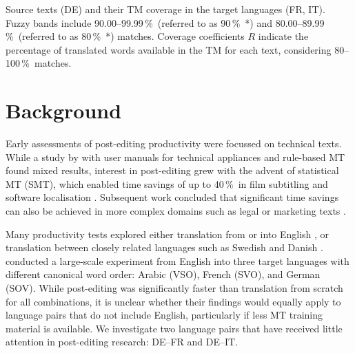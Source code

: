 \documentclass[11pt]{article}
\newcommand{\eg}{e.\,g.,\ }
\newcommand{\percent}{\,\%\ }
\begin{document}


\begin{table*}[t]
    \centering
    \renewcommand{\arraystretch}{1.2}
    \fontsize{10.1pt}{10.1pt}\selectfont
    
    \caption{Source texts (DE) and their TM coverage in the target languages (FR, IT). Fuzzy bands include 90.00--99.99\percent (referred to as 90\percent*) and 80.00--89.99\percent (referred to as 80\percent*) matches. Coverage coefficients $R$ indicate the percentage of translated words available in the TM for each text, considering 80--100\percent matches.}
    \label{tab:Texts}
\end{table*}

\section{Background}
\label{sec:Background}

Early assessments of post-editing productivity were focussed on technical texts. While a study by \citet{Krings1994} with user manuals for technical appliances and rule-based MT found mixed results, interest in post-editing grew with the advent of statistical MT (SMT), which enabled time savings of up to 40\percent in film subtitling \citep{Volk2008,Sousa2011} and software localisation \citep{PlittMasselot2010}. Subsequent work concluded that significant time savings can also be achieved in more complex domains such as legal \citep{Federico2012} or marketing texts \citep{Laeubli2013}.

Many productivity tests explored either translation from or into English \citep[\eg][]{PlittMasselot2010}, or translation between closely related languages such as Swedish and Danish \citep[\eg][]{Volk2008}. \citet{Green2013} conducted a large-scale experiment from English into three target languages with different canonical word order: Arabic (VSO), French (SVO), and German (SOV). While post-editing was significantly faster than translation from scratch for all combinations, it is unclear whether their findings would equally apply to language pairs that do not include English, particularly if less MT training material is available. We investigate two language pairs that have received little attention in post-editing research: DE--FR and DE--IT.
\end{document}
